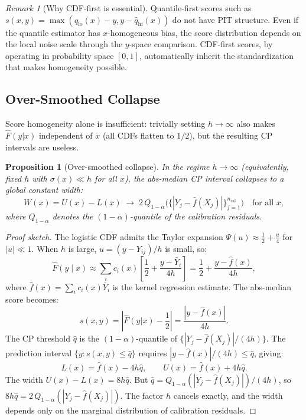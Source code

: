 \documentclass[11pt]{article}
\newtheorem{proposition}[theorem]{Proposition}
\theoremstyle{remark}
\newtheorem{remark}[theorem]{Remark}
\begin{document}
\begin{remark}[Why CDF-first is essential]
\label{rem:cdf-first}
Quantile-first scores such as
$s(x,y) = \max(\hat{q}_{\mathrm{lo}}(x) - y, y - \hat{q}_{\mathrm{hi}}(x))$
do not have PIT structure. Even if the quantile estimator has
$x$-homogeneous bias, the score distribution depends on the local
noise scale through the $y$-space comparison. CDF-first scores, by
operating in probability space $[0,1]$, automatically inherit the
standardization that makes homogeneity possible.
\end{remark}


\subsection{Over-Smoothed Collapse}
\label{sec:oversmooth}

Score homogeneity alone is insufficient: trivially setting $h \to \infty$
also makes $\hat{F}(y|x)$ independent of $x$ (all CDFs flatten to
$1/2$), but the resulting CP intervals are useless.

\begin{proposition}[Over-smoothed collapse]
\label{prop:oversmooth}
In the regime $h \to \infty$ (equivalently, fixed $h$ with
$\sigma(x) \ll h$ for all $x$), the abs-median CP interval collapses
to a global constant width:
\begin{equation}
\label{eq:collapsed-width}
  W(x) = U(x) - L(x) \;\to\;
  2\,Q_{1-\alpha}\bigl(\{|Y_j - \hat{f}(X_j)|\}_{j=1}^{n_{\mathrm{cal}}}\bigr)
  \quad \text{for all } x,
\end{equation}
where $Q_{1-\alpha}$ denotes the $(1-\alpha)$-quantile of the
calibration residuals.
\end{proposition}

\begin{proof}[Proof sketch]
The logistic CDF admits the Taylor expansion
$\Psi(u) \approx \frac{1}{2} + \frac{u}{4}$ for $|u| \ll 1$.
When $h$ is large, $u = (y - Y_{ij})/h$ is small, so:
\[
  \hat{F}(y \mid x)
  \approx \sum_i c_i(x)\!\left[\frac{1}{2}
    + \frac{y - \bar{Y}_i}{4h}\right]
  = \frac{1}{2} + \frac{y - \hat{f}(x)}{4h},
\]
where $\hat{f}(x) = \sum_i c_i(x)\bar{Y}_i$ is the kernel regression
estimate. The abs-median score becomes:
\[
  s(x, y) = \left|\hat{F}(y|x) - \frac{1}{2}\right|
  = \frac{|y - \hat{f}(x)|}{4h}.
\]
The CP threshold $\hat{q}$ is the $(1-\alpha)$-quantile of
$\{|Y_j - \hat{f}(X_j)|/(4h)\}$. The prediction interval
$\{y : s(x,y) \le \hat{q}\}$ requires
$|y - \hat{f}(x)|/(4h) \le \hat{q}$, giving:
\[
  L(x) = \hat{f}(x) - 4h\hat{q}, \qquad
  U(x) = \hat{f}(x) + 4h\hat{q}.
\]
The width $U(x) - L(x) = 8h\hat{q}$. But
$\hat{q} = Q_{1-\alpha}(|Y_j - \hat{f}(X_j)|)/(4h)$, so
$8h\hat{q} = 2\,Q_{1-\alpha}(|Y_j - \hat{f}(X_j)|)$.
The factor $h$ cancels exactly, and the width depends only on the
marginal distribution of calibration residuals.
\end{proof}
\end{document}
